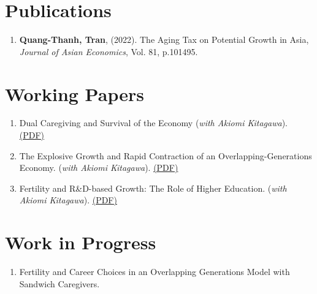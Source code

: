 \section{\sc Publications}
\begin{enumerate}
\item
  {\bf Quang-Thanh, Tran},
  (2022).
  {The Aging Tax on Potential Growth in Asia},
  {\it Journal of Asian Economics}, Vol. 81, p.101495.
\end{enumerate}

\section{\sc Working Papers}
\begin{enumerate}
  \item Dual Caregiving and Survival of the Economy (\textit{with Akiomi Kitagawa}). \href{https://www.dropbox.com/scl/fi/s00pcg0017vtyeb364hlc/main_dualcare-copy.pdf?rlkey=koecpcdaoeroijigjm5x4dtzv&st=6rnfdie5&dl=0}{(PDF)}
  \item The Explosive Growth and Rapid Contraction of an Overlapping-Generations Economy. (\textit{with Akiomi Kitagawa}). \href{https://www.dropbox.com/scl/fi/a7b1vnmypehibjmd2wim4/main_rapidcontraction.pdf?rlkey=t3aoep2iiy7shjmpq9cp6tuz3&st=b5jwqdqg&dl=0}{(PDF)}
  \item Fertility and R\&D-based Growth: The Role of Higher Education. (\textit{with Akiomi Kitagawa}). \href{https://www.dropbox.com/scl/fi/6bkvc2vxrbst1iwocxwdl/main_overedu.pdf?rlkey=v59fcybxfcd105y2ciassjttn&st=ym5ntxq0&dl=0}{(PDF)}
\end{enumerate}

\section{\sc Work in Progress}
\begin{enumerate}
  \item Fertility and Career Choices in an Overlapping Generations Model with Sandwich Caregivers.
\end{enumerate}


